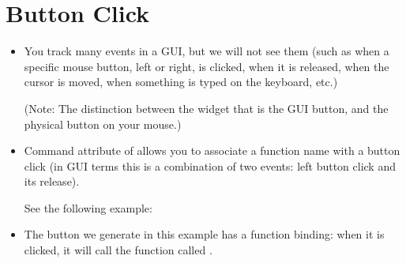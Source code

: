 \documentclass[letterpaper,10pt,english]{sphinxmanual}
\begin{document}
\section{Button Click}
\label{\detokenize{lecture_notes/lec22_tkinter:button-click}}\begin{itemize}
\item {} 
You track many events in a GUI, but we will not see
them (such as when a specific mouse button, left or right, is
clicked, when it is released, when the cursor is moved, when
something is typed on the keyboard, etc.)

(Note: The distinction between the
widget that is the GUI button, and the physical button on your
mouse.)

\item {} 
Command attribute of  allows you to associate a function name
with a button click (in GUI terms this is a combination of two
events: left button click and its release).

See the following example:

%
\begin{sphinxVerbatim}[commandchars=\\\{\}]
    
\end{sphinxVerbatim}

\item {} 
The button we generate in this example has a function binding: when it
is clicked, it will call the function called .

\end{itemize}
\end{document}

